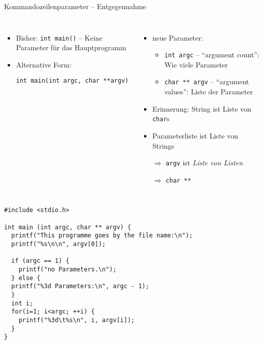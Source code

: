 \begin{frame}[fragile]{Kommandozeilenparameter -- Entgegennahme}
%
\begin{columns}[T]
\begin{itemize}
\item Bisher: \texttt{int main()} -- Keine Parameter für das Hauptprogramm
\item Alternative Form: 
	\begin{codebox}
	\footnotesize\texttt{int main(int argc, char **argv)}
	\end{codebox}
\end{itemize}
%
\begin{itemize}
\item neue Parameter:
	\begin{itemize}
	\item \texttt{int argc} -- \enquote{argument count}: Wie viele Parameter
	\item \texttt{char ** argv} -- \enquote{argument values}: Liste der Parameter
	\end{itemize}
\item Erinnerung: String ist Liste von \texttt{char}s
\item Parameterliste ist Liste von Strings
\item[$\Rightarrow$] \texttt{argv} ist \emph{Liste von Listen}
\item[$\Rightarrow$] \texttt{char **}
\end{itemize}
\end{columns}
%
\end{frame}


\begin{frame}[fragile]
%
\begin{codebox}\label{code:cmdLine}
\begin{verbatim}
#include <stdio.h>

int main (int argc, char ** argv) {
  printf("This programme goes by the file name:\n");
  printf("%s\n\n", argv[0]);
  
  if (argc == 1) {
    printf("no Parameters.\n");
  } else {
  printf("%3d Parameters:\n", argc - 1);
  }
  int i;
  for(i=1; i<argc; ++i) {
    printf("%3d\t%s\n", i, argv[i]);
  }
}
\end{verbatim}
\end{codebox}
%
\end{frame}

